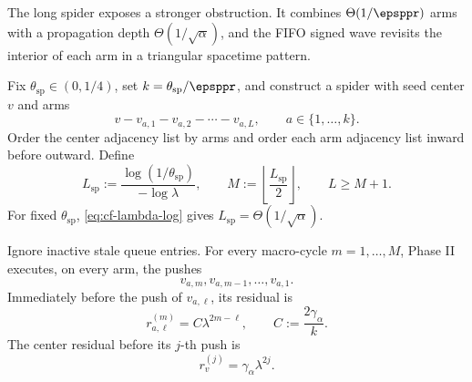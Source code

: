 The long spider exposes a stronger obstruction.  It combines
\(\Theta(1/\epsppr)\) arms with a propagation depth
\(\Theta(1/\sqrt\alpha)\), and the FIFO signed wave revisits the interior of
each arm in a triangular spacetime pattern.

Fix \(\theta_{\mathrm{sp}}\in(0,1/4)\), set
\(k=\theta_{\mathrm{sp}}/\epsppr\), and construct a spider with seed center
\(v\) and arms
\begin{equation}
    v-v_{a,1}-v_{a,2}-\cdots-v_{a,L},
    \qquad a\in\{1,\ldots,k\}.
    \label{eq:cf-spider}
\end{equation}
Order the center adjacency list by arms and order each arm adjacency list
inward before outward.  Define
\begin{equation}
    L_{\mathrm{sp}}:=\frac{\log(1/\theta_{\mathrm{sp}})}{-\log\lambda},
    \qquad
    M:=\left\lfloor\frac{L_{\mathrm{sp}}}{2}\right\rfloor,
    \qquad
    L\geq M+1.
    \label{eq:cf-spider-scales}
\end{equation}
For fixed \(\theta_{\mathrm{sp}}\), \cref{eq:cf-lambda-log} gives
\(L_{\mathrm{sp}}=\Theta(1/\sqrt\alpha)\).

\begin{lemma}
\label{lem:cf-spider-wave}
Ignore inactive stale queue entries.  For every macro-cycle
\(m=1,\ldots,M\), Phase II executes, on every arm, the pushes
\begin{equation}
    v_{a,m},v_{a,m-1},\ldots,v_{a,1}.
    \label{eq:cf-spider-push-order}
\end{equation}
Immediately before the push of \(v_{a,\ell}\), its residual is
\begin{equation}
    r_{a,\ell}^{(m)}
    =C\lambda^{2m-\ell},
    \qquad
    C:=\frac{2\gamma_\alpha}{k}.
    \label{eq:cf-spider-residual}
\end{equation}
The center residual before its \(j\)-th push is
\begin{equation}
    r_v^{(j)}=\gamma_\alpha\lambda^{2j}.
    \label{eq:cf-spider-center-residual}
\end{equation}
\end{lemma}

